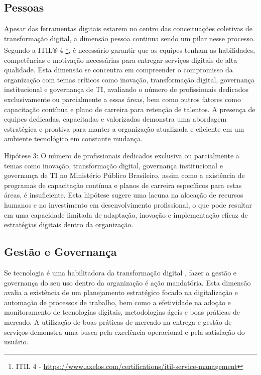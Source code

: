 \subsection{Pessoas}

Apesar das ferramentas digitais estarem no centro das conceituações coletivas de transformação digital, a dimensão pessoa continua sendo um pilar nesse processo. Segundo a ITIL® 4 \footnote{ITIL 4 - \url{https://www.axelos.com/certifications/itil-service-management}}, é necessário garantir que as equipes tenham as habilidades, competências e motivação necessárias para entregar serviços digitais de alta qualidade. Esta dimensão se concentra em compreender o compromisso da organização com temas críticos como inovação, transformação digital, governança institucional e governança de TI, avaliando o número de profissionais dedicados exclusivamente ou parcialmente a essas áreas, bem como outros fatores como capacitação contínua e plano de carreira para retenção de talentos. A presença de equipes dedicadas, capacitadas e valorizadas demonstra uma abordagem estratégica e proativa para manter a organização atualizada e eficiente em um ambiente tecnológico em constante mudança. 

Hipótese 3: O número de profissionais dedicados exclusiva ou parcialmente a temas como inovação, transformação digital, governança institucional e governança de TI no Ministério Público Brasileiro, assim como a existência de programas de capacitação contínua e planos de carreira específicos para estas áreas, é insuficiente. Esta hipótese sugere uma lacuna na alocação de recursos humanos e no investimento em desenvolvimento profissional, o que pode resultar em uma capacidade limitada de adaptação, inovação e implementação eficaz de estratégias digitais dentro da organização.

 \subsection{Gestão e Governança}

 Se tecnologia é uma habilitadora da transformação digital \cite{transformacaoDigitalKraus2021}, fazer a gestão e governança do seu uso dentro da organização é ação mandatória. Esta dimensão avalia a existência de um planejamento estratégico focado na digitalização e automação de processos de trabalho, bem como a efetividade na adoção e monitoramento de tecnologias digitais, metodologias ágeis e boas práticas de mercado. A utilização de boas práticas de mercado na entrega e gestão de serviços demonstra uma busca pela excelência operacional e pela satisfação do usuário.


